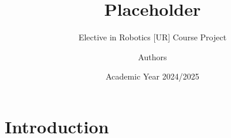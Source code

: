 \documentclass{beamer}
\title{Placeholder}
\subtitle{Elective in Robotics [UR] Course Project}
\author{{Authors}} %
\date{Academic Year 2024/2025}
\begin{document}
\maketitle
\section{Introduction}
        
\end{document}
